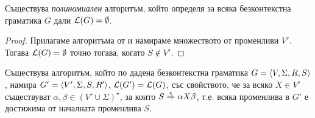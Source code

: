 \begin{framed}
  \begin{corollary}
    Съществува {\em полиномиален} алгоритъм, който определя за всяка безконтекстна граматика $G$ дали $\mathcal{L}(G) = \emptyset$.
  \end{corollary}  
\end{framed}
\begin{proof}
  Прилагаме алгоритъма от  и намираме множеството от променливи $V'$.
  Тогава $\mathcal{L}(G) = \emptyset$ точно тогава, когато $S \not\in V'$.  
\end{proof}

\begin{lemma}
  \label{lem:useless2}
  Съществува алгоритъм, който по дадена безконтекстна граматика $G = \langle{V,\Sigma,R,S}\rangle$, намира $G' = \langle{V',\Sigma,S,R'}\rangle$, $\mathcal{L}(G') = \mathcal{L}(G)$,
  със свойството, че за всяко $X \in V'$ съществуват $\alpha, \beta \in (V'\cup\Sigma)^\star$,
  за които $S \stackrel{{\star}}{\Rightarrow} \alpha X \beta$,
  т.е. всяка променлива в $G'$ е достижима от началната променлива $S$.
\end{lemma}

